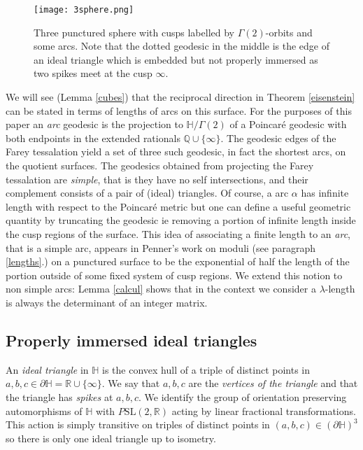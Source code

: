 \documentclass[12pt]{amsart}
\theoremstyle{plain}
\theoremstyle{definition}
\def\HH{\mathbb{H}}
\def\xx{\HH/g2}
\def\RR{\mathbb{R}}
\def\QQ{\mathbb{Q}}
\def\slr{\mathrm{SL}(2, \RR)}
\def\g2{\Gamma(2)}
\def\xx{\HH/\g2}
\begin{document}
\begin{figure}[ht]
\begin{center}
\texttt{[image: 3sphere.png]} 
% 
\end{center}
\caption{Three punctured sphere with cusps labelled by $\Gamma(2)$-orbits
and some arcs.
Note that the dotted geodesic in the middle is the edge 
of an ideal triangle which is embedded but not properly immersed
as two spikes meet at the cusp $\infty$.}
 \label{3punctured}
\end{figure}

We will see (Lemma \ref{cubes}) that the reciprocal direction in 
Theorem \ref{eisenstein} can be stated in terms  of  lengths
 of arcs on  this surface.
 For the purposes of this paper
 an \textit{arc} geodesic 
 is the projection to $\xx$ of a 
 Poincar\'e geodesic with both  endpoints in the 
 extended rationals $\QQ \cup \{ \infty\}$.
The geodesic edges of the Farey tessalation yield a set of three such geodesic, 
 in fact the shortest arcs,  on the quotient surfaces.
The geodesics obtained from projecting the Farey tessalation 
are \textit{simple}, that is they have no self intersections, 
and their complement consists of a pair of (ideal) triangles.
Of course, a arc $\alpha$ has infinite length with respect to the Poincar\'e metric  but one can define a useful geometric quantity   by truncating the geodesic ie removing a portion of infinite length  inside the cusp regions of the surface.
This idea of associating a finite length to an \textit{arc},
that is a simple arc,
appears in Penner's work on moduli \cite{bob}
 (see paragraph \ref{lengths}.) 
on a punctured
surface to be the exponential of half the 
length of the portion outside of some fixed
system of cusp regions.
We extend this notion to non simple arcs:
Lemma \ref{calcul} shows that in the context we consider
a $\lambda$-length is always the determinant 
of an integer matrix.

\subsection{Properly immersed ideal triangles}

An \textit{ideal triangle} in $\HH$  is the convex hull 
of a triple of distinct points in $a,b,c \in \partial \HH = \RR \cup \{ \infty \}$.
We say that $a,b,c$ are the \textit{vertices of the triangle}
and that the triangle has \textit{spikes} at $a,b,c$.
We identify the  group of orientation preserving automorphisms of $\HH$
 with $P\slr$ acting by linear fractional transformations.
This action is simply transitive  on
triples of distinct points in $(a,b,c) \in (\partial \HH)^3$
so there is only one ideal triangle up to isometry.
\end{document}
